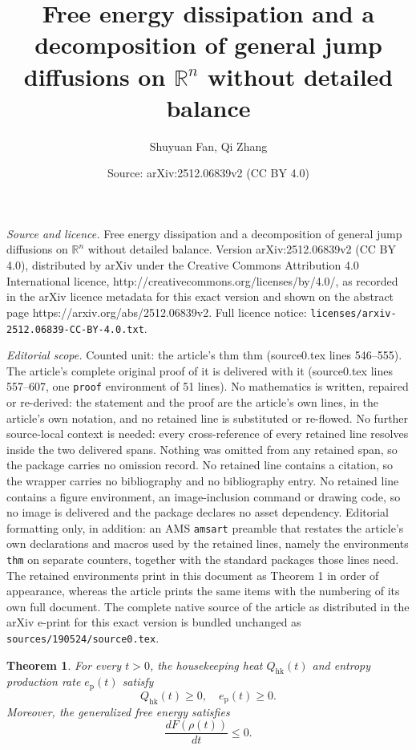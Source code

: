\documentclass[10pt,a4paper]{amsart}
\title{Free energy dissipation and a decomposition of general jump diffusions on $\mathbb{R}^n$ without detailed balance}
\author{Shuyuan Fan, Qi Zhang}
\date{Source: arXiv:2512.06839v2 (CC BY 4.0)}
\newtheorem{thm}{Theorem}
\begin{document}
\maketitle

\noindent\emph{Source and licence.} Free energy dissipation and a decomposition of general jump diffusions on $\mathbb{R}^n$ without detailed balance. Version arXiv:2512.06839v2 (CC BY 4.0), distributed by arXiv under the Creative Commons Attribution 4.0 International licence, http://creativecommons.org/licenses/by/4.0/, as recorded in the arXiv licence metadata for this exact version and shown on the abstract page https://arxiv.org/abs/2512.06839v2. Full licence notice: \texttt{licenses/arxiv-2512.06839-CC-BY-4.0.txt}.\par\smallskip

\noindent\textit{Editorial scope.} Counted unit: the article's thm thm (source0.tex lines 546--555). The article's complete original proof of it is delivered with it (source0.tex lines 557--607, one \texttt{proof} environment of 51 lines). No mathematics is written, repaired or re-derived: the statement and the proof are the article's own lines, in the article's own notation, and no retained line is substituted or re-flowed.  No further source-local context is needed: every cross-reference of every retained line resolves inside the two delivered spans.  Nothing was omitted from any retained span, so the package carries no omission record.  No retained line contains a citation, so the wrapper carries no bibliography and no bibliography entry.  No retained line contains a figure environment, an image-inclusion command or drawing code, so no image is delivered and the package declares no asset dependency.  Editorial formatting only, in addition: an AMS \texttt{amsart} preamble that restates the article's own declarations and macros used by the retained lines, namely the environments \texttt{thm} on separate counters, together with the standard packages those lines need.  The retained environments print in this document as Theorem 1 in order of appearance, whereas the article prints the same items with the numbering of its own full document.  The complete native source of the article as distributed in the arXiv e-print for this exact version is bundled unchanged as \texttt{sources/190524/source0.tex}.
\begin{thm}
For every $t>0$, the housekeeping heat $Q_\mathrm{hk}(t)$ and entropy production rate $e_\mathrm{p}(t)$ satisfy
\begin{equation*}
    Q_\mathrm{hk}(t) \geq 0, \quad e_\mathrm{p}(t) \geq 0.
\end{equation*}
Moreover, the generalized free energy satisfies
\begin{equation*}
    \frac{dF(\rho(t))}{dt} \leq 0.
\end{equation*}
\end{thm}
\end{document}
